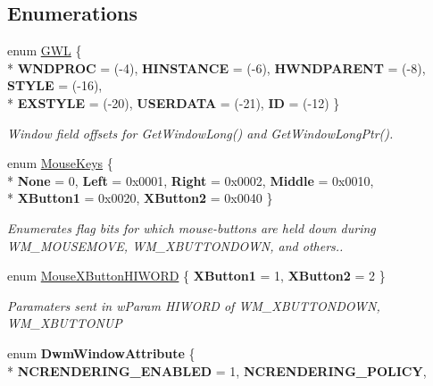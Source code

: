 \subsection*{Enumerations}
\begin{DoxyCompactItemize}
\item 
enum \hyperlink{namespace_open_t_k_1_1_platform_1_1_windows_aeecca222b998fe7822b34fc81826998c}{G\-W\-L} \{ \\*
{\bfseries W\-N\-D\-P\-R\-O\-C} = (-\/4), 
{\bfseries H\-I\-N\-S\-T\-A\-N\-C\-E} = (-\/6), 
{\bfseries H\-W\-N\-D\-P\-A\-R\-E\-N\-T} = (-\/8), 
{\bfseries S\-T\-Y\-L\-E} = (-\/16), 
\\*
{\bfseries E\-X\-S\-T\-Y\-L\-E} = (-\/20), 
{\bfseries U\-S\-E\-R\-D\-A\-T\-A} = (-\/21), 
{\bfseries I\-D} = (-\/12)
 \}
\begin{DoxyCompactList}\small\item\em Window field offsets for Get\-Window\-Long() and Get\-Window\-Long\-Ptr(). \end{DoxyCompactList}\item 
enum \hyperlink{namespace_open_t_k_1_1_platform_1_1_windows_a781d0e922402f6417e08317522cdb030}{Mouse\-Keys} \{ \\*
{\bfseries None} = 0, 
{\bfseries Left} = 0x0001, 
{\bfseries Right} = 0x0002, 
{\bfseries Middle} = 0x0010, 
\\*
{\bfseries X\-Button1} = 0x0020, 
{\bfseries X\-Button2} = 0x0040
 \}
\begin{DoxyCompactList}\small\item\em Enumerates flag bits for which mouse-\/buttons are held down during W\-M\-\_\-\-M\-O\-U\-S\-E\-M\-O\-V\-E, W\-M\-\_\-\-X\-B\-U\-T\-T\-O\-N\-D\-O\-W\-N, and others.. \end{DoxyCompactList}\item 
enum \hyperlink{namespace_open_t_k_1_1_platform_1_1_windows_afc978c999990d5fc90fb112bd139b348}{Mouse\-X\-Button\-H\-I\-W\-O\-R\-D} \{ {\bfseries X\-Button1} = 1, 
{\bfseries X\-Button2} = 2
 \}
\begin{DoxyCompactList}\small\item\em Paramaters sent in w\-Param H\-I\-W\-O\-R\-D of W\-M\-\_\-\-X\-B\-U\-T\-T\-O\-N\-D\-O\-W\-N, W\-M\-\_\-\-X\-B\-U\-T\-T\-O\-N\-U\-P \end{DoxyCompactList}\item 
enum {\bfseries Dwm\-Window\-Attribute} \{ \\*
{\bfseries N\-C\-R\-E\-N\-D\-E\-R\-I\-N\-G\-\_\-\-E\-N\-A\-B\-L\-E\-D} = 1, 
{\bfseries N\-C\-R\-E\-N\-D\-E\-R\-I\-N\-G\-\_\-\-P\-O\-L\-I\-C\-Y}, 

\end{DoxyCompactItemize}
